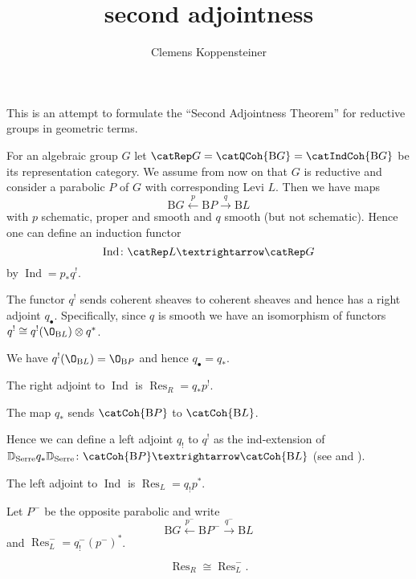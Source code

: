 \documentclass[english]{short-notes}
\title{second adjointness}
\author{Clemens Koppensteiner}
\renewcommand\B{\mathrm{B}}
\newcommand\Ind{\operatorname{Ind}}
\newcommand\Res{\operatorname{Res}}
\begin{document}
\maketitle

This is an attempt to formulate the \enquote{Second Adjointness Theorem} for reductive groups in geometric terms.

For an algebraic group $G$ let $\catRep G = \catQCoh{\B G} = \catIndCoh{\B G}$ be its representation category.
We assume from now on that $G$ is reductive and consider a parabolic $P$ of $G$ with corresponding Levi $L$.
Then we have maps
\[
    \B G \xleftarrow{p} \B P \xrightarrow{q} \B L
\]
with $p$ schematic, proper and smooth and $q$ smooth (but not schematic).
Hence one can define an induction functor
\[
    \Ind\colon \catRep L → \catRep G
\]
by $\Ind = p_*q^!$.

The functor $q^!$ sends coherent sheaves to coherent sheaves \cite[Lemma~7.1.2]{Gaitsgory:preprint:IndcoherentSheaves} and hence has a right adjoint $q_{\bullet}$.
Specifically, since $q$ is smooth we have an isomorphism of functors $q^! \cong q^!(\O_{\B L}) \otimes q^*$.
\begin{Claim}
    We have $q^!(\O_{\B L}) = \O_{\B P}$ and hence $q_\bullet = q_*$.
\end{Claim}

\begin{Cor}
    The right adjoint to $\Ind$ is $\Res_R = q_*p^!$.
\end{Cor}

\begin{Claim}
    The map $q_*$ sends $\catCoh{\B P}$ to $\catCoh{\B L}$.
\end{Claim}

Hence we can define a left adjoint $q_!$ to $q^!$ as the ind-extension of $\mathbb D_{\mathrm{Serre}} q_* \mathbb D_{\mathrm{Serre}}\colon \catCoh{\B P} → \catCoh{\B L}$ (see \cite[Corollary~9.5.9(a)]{Gaitsgory:preprint:IndcoherentSheaves} and \cite{Gaitsgory:preprint:GL.DGcat}).

\begin{Cor}
    The left adjoint to $\Ind$ is $\Res_L = q_!p^*$.
\end{Cor}

Let $P^-$ be the opposite parabolic and write
\[
    \B G \xleftarrow{p^-} \B P^- \xrightarrow{q^-} \B L
\]
and $\Res_L^- = q^-_!(p^-)^*$.

\begin{Claim}
    \[
        \Res_R \cong \Res_L^-.
    \]
\end{Claim}
\end{document}
